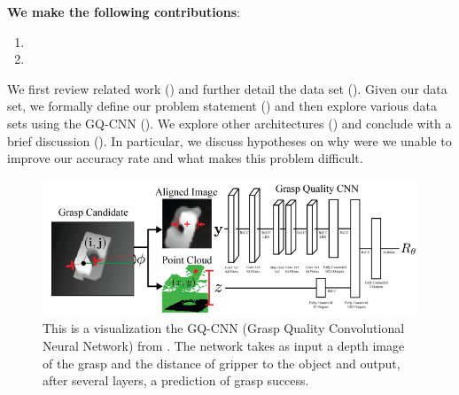 \textbf{We make the following contributions}:
\begin{enumerate}
    \item {}
		\item {}
\end{enumerate}

We first review related work () and further detail the data set (). 
Given our data set, we formally define our problem statement () and then explore various data sets using the GQ-CNN (). 
We explore other architectures () and conclude with a brief discussion (). 
In particular, we discuss hypotheses on why were we unable to improve our accuracy rate and what makes this problem difficult. 

\begin{figure}[t!]
    \includegraphics[width=0.99\columnwidth]{figs/dexnet.PNG}
\caption{This is a visualization the GQ-CNN (Grasp Quality Convolutional Neural Network) from \cite{mahler2017dex}. The network takes as input a depth image of the grasp and the distance of gripper to the object and output, after several layers, a prediction of grasp success.} \label{fig:dexnet_network}
\end{figure}

